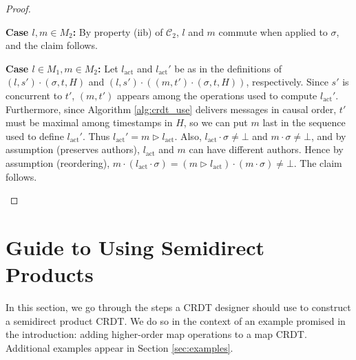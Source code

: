 \documentclass[acmsmall,nonacm]{acmart}
\newcommand{\mc}[1]{\ensuremath{\mathcal{#1}}}
\newcommand{\act}{\triangleright}
\theoremstyle{plain}
\theoremstyle{definition}
\begin{document}
\begin{proof}
\begin{enumerate}[(i)]
\textbf{Case $l, m \in M_2$:} By property (iib) of $\mc{C}_2$, $l$ and $m$ commute when applied to $\sigma$, and the claim follows.
    
\textbf{Case $l \in M_1, m \in M_2$:} Let $l_{\text{act}}$ and $l_{\text{act}}'$ be as in the definitions of $(l, s') \cdot (\sigma, t, H)$ and $(l, s') \cdot ((m, t') \cdot (\sigma, t, H))$, respectively.  Since $s'$ is concurrent to $t'$, $(m, t')$ appears among the operations used to compute $l_{\text{act}}'$. Furthermore, since Algorithm \ref{alg:crdt_use} delivers messages in causal order, $t'$ must be maximal among timestamps in $H$, so we can put $m$ last in the sequence used to define $l_{\text{act}}'$.  Thus $l_{\text{act}}' = m \act l_{\text{act}}$.  Also, $l_{\text{act}} \cdot \sigma \neq \bot$ and $m \cdot \sigma \neq \bot$, and by assumption (preserves authors), $l_{\text{act}}$ and $m$ can have different authors.  Hence by assumption (reordering), $m \cdot (l_{\text{act}} \cdot \sigma) = (m \act l_{\text{act}}) \cdot (m \cdot \sigma) \neq \bot$.  The claim follows.
\end{enumerate}
\end{proof}




\section{Guide to Using Semidirect Products}
\label{sec:tutorial}
In this section, we go through the steps a CRDT designer should use to construct a semidirect product CRDT.  We do so in the context of an example promised in the introduction: adding higher-order map operations to a map CRDT.  Additional examples appear in Section \ref{sec:examples}.
\end{document}

